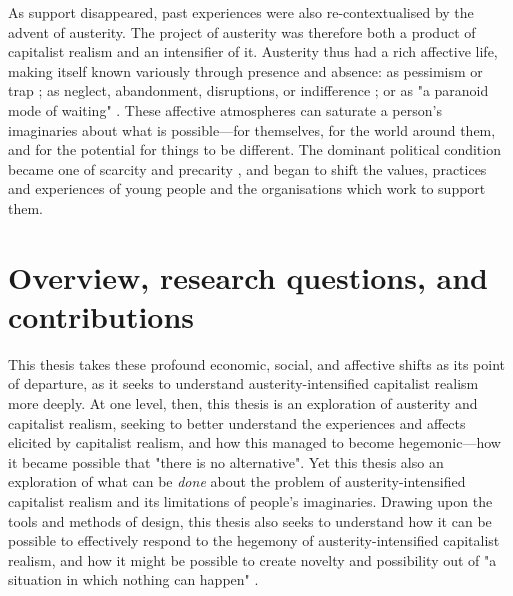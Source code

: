 As support disappeared, past experiences were also re-contextualised by the advent of austerity. The project of austerity was therefore both a product of capitalist realism and an intensifier of it. Austerity thus had a rich affective life, making itself known variously through presence and absence: as pessimism or trap \citep{coleman_austerity_2016}; as neglect, abandonment, disruptions, or indifference  \citep{raynor_dramatising_2017}; or as "a paranoid mode of waiting" \citep[p. 13]{hitchen_affective_2019}. These affective atmospheres can saturate a person's imaginaries about what is possible—for themselves, for the world around them, and for the potential for things to be different. The dominant political condition became one of scarcity and precarity \citep{berlant_cruel_2011}, and began to shift the values, practices and experiences of young people and the organisations which work to support them. 

\section{Overview, research questions, and contributions}
This thesis takes these profound economic, social, and affective shifts as its point of departure, as it seeks to understand austerity-intensified capitalist realism more deeply. At one level, then, this thesis is an exploration of austerity and capitalist realism, seeking to better understand the experiences and affects elicited by capitalist realism, and how this managed to become hegemonic—how it became possible that "there is no alternative". Yet this thesis also an exploration of what can be \textit{done} about the problem of austerity-intensified capitalist realism and its limitations of people's imaginaries. Drawing upon the tools and methods of design, this thesis also seeks to understand how it can be possible to effectively respond to the hegemony of austerity-intensified capitalist realism, and how it might be possible to create novelty and possibility out of "a situation in which nothing can happen" \citep[p. 81]{fisher_capitalist_2009}.

